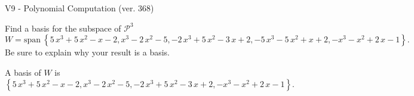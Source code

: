 \begin{exercise}
  \begin{exerciseTitle}V9 - Polynomial Computation (ver. 368)\end{exerciseTitle}
  \begin{exerciseStatement}
    Find a basis for the subspace of \(\mathcal{P}^3\) 
\[W=\mathrm{span}\ \left\{5 \, x^{3} + 5 \, x^{2} - x - 2 , x^{3} - 2 \, x^{2} - 5 , -2 \, x^{3} + 5 \, x^{2} - 3 \, x + 2 , -5 \, x^{3} - 5 \, x^{2} + x + 2 , -x^{3} - x^{2} + 2 \, x - 1\right\}.\]
 Be sure to explain why your result is a basis.


  \end{exerciseStatement}
  \begin{exerciseAnswer}
   A basis of \(W\) is  \(\left\{5 \, x^{3} + 5 \, x^{2} - x - 2 , x^{3} - 2 \, x^{2} - 5 , -2 \, x^{3} + 5 \, x^{2} - 3 \, x + 2 , -x^{3} - x^{2} + 2 \, x - 1\right\}\).
  


  \end{exerciseAnswer}
\end{exercise}
